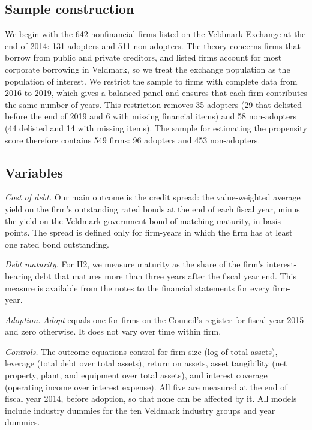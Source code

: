 \documentclass[11pt]{article}
\begin{document}
\subsection{Sample construction}

We begin with the 642 nonfinancial firms listed on the Veldmark Exchange at the end of 2014: 131 adopters and 511 non-adopters. The theory concerns firms that borrow from public and private creditors, and listed firms account for most corporate borrowing in Veldmark, so we treat the exchange population as the population of interest. We restrict the sample to firms with complete data from 2016 to 2019, which gives a balanced panel and ensures that each firm contributes the same number of years. This restriction removes 35 adopters (29 that delisted before the end of 2019 and 6 with missing financial items) and 58 non-adopters (44 delisted and 14 with missing items). The sample for estimating the propensity score therefore contains 549 firms: 96 adopters and 453 non-adopters.

\subsection{Variables}

\textit{Cost of debt.} Our main outcome is the credit spread: the value-weighted average yield on the firm's outstanding rated bonds at the end of each fiscal year, minus the yield on the Veldmark government bond of matching maturity, in basis points. The spread is defined only for firm-years in which the firm has at least one rated bond outstanding.

\textit{Debt maturity.} For H2, we measure maturity as the share of the firm's interest-bearing debt that matures more than three years after the fiscal year end. This measure is available from the notes to the financial statements for every firm-year.

\textit{Adoption.} \textit{Adopt} equals one for firms on the Council's register for fiscal year 2015 and zero otherwise. It does not vary over time within firm.

\textit{Controls.} The outcome equations control for firm size (log of total assets), leverage (total debt over total assets), return on assets, asset tangibility (net property, plant, and equipment over total assets), and interest coverage (operating income over interest expense). All five are measured at the end of fiscal year 2014, before adoption, so that none can be affected by it. All models include industry dummies for the ten Veldmark industry groups and year dummies.
\end{document}
